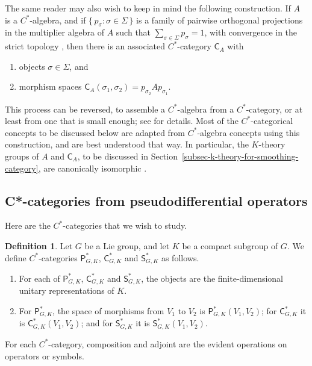 \documentclass[leqno,11pt]{amsart}
\numberwithin{equation}{subsection}
\theoremstyle{plain}
\theoremstyle{definition}
\newtheorem{definition}[equation]{Definition}
\theoremstyle{remark}
\newcommand{\PSDO}{\mathsf{P}}
\newcommand{\CC}{\mathsf{C}}
\newcommand{\Symb}{\mathsf{S}}
\begin{document}
The same reader may also wish to keep in mind the following construction. If $A$ is a $C^*$-algebra, and if $\{\, p_\sigma :  \sigma \in \Sigma\,\}$ is a family of pairwise orthogonal projections in the multiplier algebra of $A$ such that  $\sum _{\sigma \in \Sigma} p_\sigma = 1$, with convergence in the strict topology \cite[3.12.17]{PedersenCstarBook}, then there is an associated $C^*$-category $\mathsf{C}_A$ with
\begin{enumerate}[\rm (i)]

\item   objects  $\sigma \in \Sigma$, and 

\item  morphism spaces   $\mathsf{C}_A(\sigma_1,\sigma_2) =p_{\sigma_2}Ap_{\sigma_1}$.

\end{enumerate}
This process can be reversed, to assemble a $C^*$-algebra from a $C^*$-category, or at least from one that is  small enough;  see \cite[Sec.\,3]{Joachim03} for details.  Most of the $C^*$-categorical concepts to be discussed below are adapted from $C^*$-algebra concepts using this construction, and are best understood that way.  In particular, the $K$-theory groups of $A$ and $\mathsf{C}_A$, to be discussed in Section~\ref{subsec-k-theory-for-smoothing-category}, are canonically isomorphic \cite[Cor.\,3.5]{Joachim03}.
    
 
\subsection{C*-categories from pseudodifferential operators}
\label{sec-c-star-categories-from-psdo}
Here are the $C^*$-categories  that we wish to study. 
 

\begin{definition} 
Let $G$ be a  Lie group, and let $K$ be a compact subgroup of $G$. We define $C^*$-categories $\PSDO^{*}_{G,K}$, $\CC^*_{G,K}$ and $\Symb^*_{G,K}$ as follows.
 \begin{enumerate}[\rm (i)]

\item For each of $\PSDO^{*}_{G,K}$, $\CC^*_{G,K}$ and $\Symb^*_{G,K}$, the objects are the finite-dimensional unitary representations of $K$.

 \item For  $\PSDO^{*}_{G,K}$, the space of morphisms from $V_1$ to $V_2$  is $\PSDO^*_{G,K}(V_1,V_2)$; for  $\CC^*_{G,K}$ it   is $\CC^*_{G,K}(V_1,V_2)$; and for  $\Symb^*_{G,K}$ it   is $\Symb^*_{G,K}(V_1,V_2)$.  
 
 \end{enumerate}
For each $C^*$-category, composition  and adjoint are the evident operations on operators or symbols. 
\end{definition}
\end{document}

